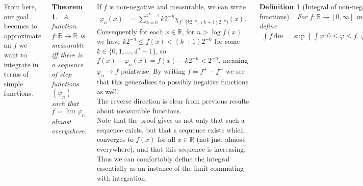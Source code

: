 \documentclass{tikzposter} %
\newtheorem{theorem}{Theorem}
\newtheorem{definition}{Definition}
\begin{document}
\begin{columns}
{    From here, our goal becomes to approximate an $f$ we want to integrate in terms of simple functions. \\

    \begin{theorem}
    \ A function $f : \mathbb{R} \to \mathbb{R}$ is measurable iff there is a sequence of step functions $(\varphi_{n})$ such that $f = \lim \varphi_{n}$ almost everywhere.
    \end{theorem}
    \hphantom{}

    If $f$ is non-negative and measurable, we can write
    \begin{align*}
      \varphi_{n}(x) &= \sum_{k=0}^{4^{n}-1} k2^{-n}\chi_{f^{-1}[k2^{-n},(k+1)2^{-n})}(x).
    \end{align*}
    Consequently for each $x \in \mathbb{R}$, for $n > \log f(x)$ we have $k2^{-n} \le f(x) < (k+1)2^{-n}$ for some $k \in \{0,1,\dots,4^{n}-1\}$, so $f(x) - \varphi_{n}(x) = f(x)-k2^{-n} < 2^{-n}$, meaning $\varphi_{n} \to f$ pointwise. By writing $f = f^{+} - f^{-}$ we see that this generalises to possibly negative functions as well. \\

    The reverse direction is clear from previous results about measurable functions. \\

    Note that the proof gives us not only that such a sequence exists, but that a sequence exists which converges to $f(x)$ for all $x \in \mathbb{R}$ (not just almost everywhere), and that this sequence is increasing. Thus we can comfortably define the integral essentially as an instance of the limit commuting with integration.\\

    \begin{definition}[Integral of non-negative functions]
      \ For $f : \mathbb{R} \to [0,\infty]$ measurable, define
      \begin{align*}
        \int f \, \mathrm{d}m = \sup \left\{ \int \varphi : 0 \le \varphi \le f, \, \varphi \,\,\mathrm{ simple } \right\}
      \end{align*}
    \end{definition}
    \hphantom{}

    This then allows us to get the more general integral: \\
    \begin{definition}[Integral of general functions]
      \ For $f : \mathbb{R} \to \mathbb{R}$, we write $f^{+} = \max(f,0)$, $f^{-} = -\min(f,0)$, so to rewrite $f = f^{+} - f^{-}$. We then define the integral:
      \begin{align*}
        \int f &= \int f^{+} - \int f^{-}.
      \end{align*}
      $f$ is \emph{integrable} if both $\int f^{+}$ and $\int f^{-}$ are finite.
    \end{definition}
    \hphantom{}

}
\end{columns}
\end{document}
